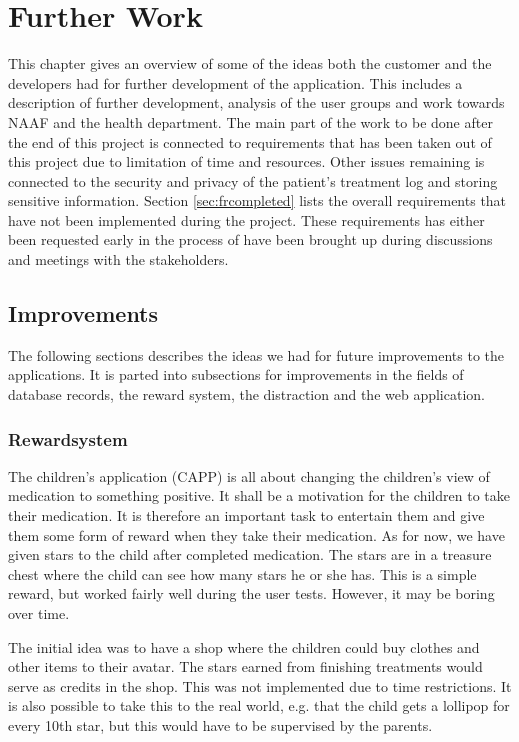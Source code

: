 \chapter{Further Work}
\label{app:furtherWork}
This chapter gives an overview of some of the ideas both the customer and the developers had for further development of the application. This includes a description of further development, analysis of the user groups and work towards NAAF and the health department.
The main part of the work to be done after the end of this project is connected to requirements that has been taken out of this project due to limitation of time and resources. Other issues remaining is connected to the security and privacy of the patient's treatment log and storing sensitive information.
Section \ref{sec:frcompleted} lists the overall requirements that have not been implemented during the project. These requirements has either been requested early in the process of have been brought up during discussions and meetings with the stakeholders. 


\section{Improvements}
\label{sec:Improvements}
The following sections describes the ideas we had for future improvements to the applications. It is parted into subsections for improvements in the fields of database records, the reward system, the distraction and the web application.

%
%

\subsection{Rewardsystem}
The children's application (CAPP) is all about changing the children's view of medication to something positive. It shall be a motivation for the children to take their medication. It is therefore an important task to entertain them and give them some form of reward when they take their medication. As for now, we have given stars to the child after completed medication. The stars are in a treasure chest where the child can see how many stars he or she has. This is a simple reward, but worked fairly well during the user tests. However, it may be boring over time. 

The initial idea was to have a shop where the children could buy clothes and other items to their avatar. The stars earned from finishing treatments would serve as credits in the shop. This was not implemented due to time restrictions. It is also possible to take this to the real world, e.g. that the child gets a lollipop for every 10th star, but this would have to be supervised by the parents. 
 

